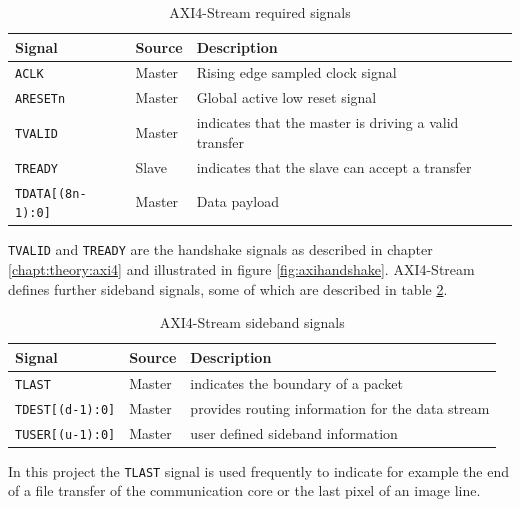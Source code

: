 \begin{table}[h]
    \centering
    \begin{tabular}{ l  l l}
        \toprule
        Signal & Source & Description \\
        \midrule
        \texttt{ACLK} & Master & Rising edge sampled clock signal \\
        \texttt{ARESETn} & Master & Global active low reset signal \\
        \texttt{TVALID} & Master & indicates that the master is driving a valid transfer
        \\
        \texttt{TREADY} & Slave & indicates that the slave can accept a transfer \\
        \texttt{TDATA[(8n-1):0]} & Master & Data payload \\
        \bottomrule
    \end{tabular}
    \caption{AXI4-Stream required signals}
    \label{tab:axi4steramreqsig}
\end{table}

\texttt{TVALID} and \texttt{TREADY} are the handshake signals as described in chapter 
\ref{chapt:theory:axi4} and illustrated in figure \ref{fig:axihandshake}.
AXI4-Stream defines further sideband signals, some of which are described in
table \ref{tab:axi4steramside}.

\begin{table}[h]
    \centering
    \begin{tabular}{ l  l l}
        \toprule
        Signal & Source & Description \\
        \midrule
        \texttt{TLAST} & Master & indicates the boundary of a packet \\
        \texttt{TDEST[(d-1):0]} & Master & provides routing information for the data stream \\
        \texttt{TUSER[(u-1):0]} & Master & user defined sideband information \\
        \bottomrule
    \end{tabular}
    \caption{AXI4-Stream sideband signals}
    \label{tab:axi4steramside}
\end{table}

In this project the \texttt{TLAST} signal is used frequently to indicate for
example the end of a file transfer of the communication core or the last pixel
of an image line.


